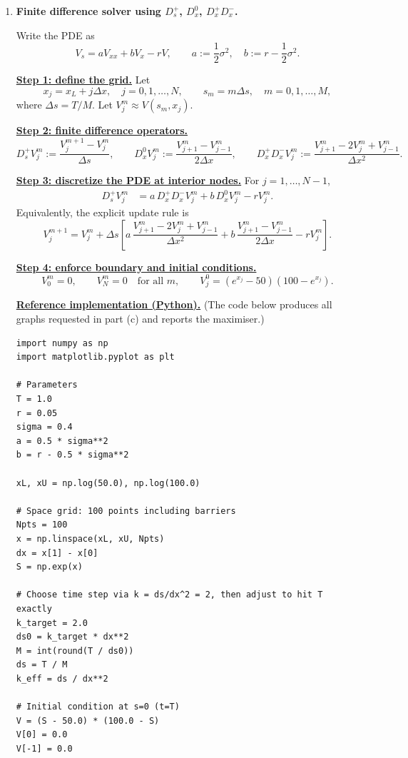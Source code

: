 \documentclass{article}
\begin{document}
\begin{enumerate}
\item[(b)] \textbf{Finite difference solver using $D_s^+$, $D_x^0$, $D_x^+D_x^-$.}

Write the PDE as
\[
V_s=aV_{xx}+bV_x-rV,
\qquad
a:=\frac12\sigma^2,\quad b:=r-\frac12\sigma^2.
\]

\medskip
\noindent\underline{\textbf{Step 1: define the grid.}}
Let
\[
x_j=x_L+j\Delta x,\quad j=0,1,\dots,N,
\qquad
s_m=m\Delta s,\quad m=0,1,\dots,M,
\]
where $\Delta s=T/M$. Let $V_j^m\approx V(s_m,x_j)$.

\medskip
\noindent\underline{\textbf{Step 2: finite difference operators.}}
\[
D_s^+V_j^m:=\frac{V_j^{m+1}-V_j^m}{\Delta s},\qquad
D_x^0V_j^m:=\frac{V_{j+1}^m-V_{j-1}^m}{2\Delta x},\qquad
D_x^+D_x^-V_j^m:=\frac{V_{j+1}^m-2V_j^m+V_{j-1}^m}{\Delta x^2}.
\]

\medskip
\noindent\underline{\textbf{Step 3: discretize the PDE at interior nodes.}}
For $j=1,\dots,N-1$,
\begin{align*}
D_s^+V_j^m
&=
a\,D_x^+D_x^-V_j^m
+b\,D_x^0V_j^m
-rV_j^m.
\end{align*}
Equivalently, the explicit update rule is
\[
\boxed{
V_j^{m+1}
=
V_j^m+\Delta s\left[
a\,\frac{V_{j+1}^m-2V_j^m+V_{j-1}^m}{\Delta x^2}
+b\,\frac{V_{j+1}^m-V_{j-1}^m}{2\Delta x}
-rV_j^m
\right].
}
\]

\medskip
\noindent\underline{\textbf{Step 4: enforce boundary and initial conditions.}}
\[
\boxed{V_0^m=0,\qquad V_N^m=0\quad\text{for all }m,}
\qquad
\boxed{V_j^0=(e^{x_j}-50)(100-e^{x_j}).}
\]

\medskip
\noindent\underline{\textbf{Reference implementation (Python).}}
(The code below produces all graphs requested in part (c) and reports the maximiser.)
\begin{verbatim}
import numpy as np
import matplotlib.pyplot as plt

# Parameters
T = 1.0
r = 0.05
sigma = 0.4
a = 0.5 * sigma**2
b = r - 0.5 * sigma**2

xL, xU = np.log(50.0), np.log(100.0)

# Space grid: 100 points including barriers
Npts = 100
x = np.linspace(xL, xU, Npts)
dx = x[1] - x[0]
S = np.exp(x)

# Choose time step via k = ds/dx^2 = 2, then adjust to hit T exactly
k_target = 2.0
ds0 = k_target * dx**2
M = int(round(T / ds0))
ds = T / M
k_eff = ds / dx**2

# Initial condition at s=0 (t=T)
V = (S - 50.0) * (100.0 - S)
V[0] = 0.0
V[-1] = 0.0


\end{verbatim}
\end{enumerate}
\end{document}
